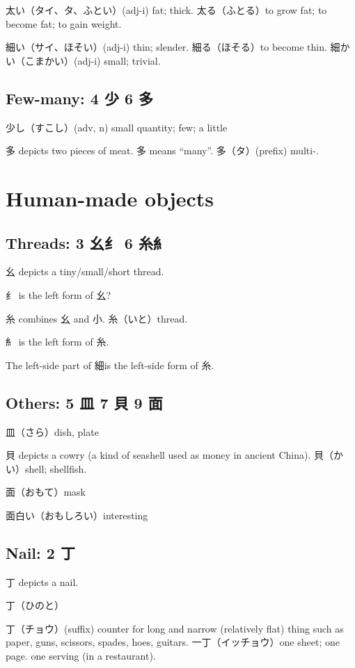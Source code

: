 太い（タイ、タ、ふとい）(adj-i) fat; thick.
太る（ふとる）to grow fat; to become fat; to gain weight.

細い（サイ、ほそい）(adj-i) thin; slender.
細る（ほそる）to become thin.
細かい（こまかい）(adj-i) small; trivial.

\subsection{Few-many: 4 少 6 多}

少し（すこし）(adv, n) small quantity; few; a little

多 depicts two pieces of meat.
多 means ``many''.
多（タ）(prefix) multi-.

\section{Human-made objects}

\subsection{Threads: 3 幺纟 6 糸糹}

幺 depicts a tiny/small/short thread.

纟 is the left form of 幺?

糸 combines 幺 and 小.
糸（いと）thread.

糹 is the left form of 糸.

The left-side part of 細is the left-side form of 糸.

\subsection{Others: 5 皿 7 貝 9 面}

皿（さら）dish, plate

貝 depicts a cowry (a kind of seashell used as money in ancient China).
貝（かい）shell; shellfish.

面（おもて）mask

面白い（おもしろい）interesting

\subsection{Nail: 2 丁}

丁 depicts a nail.

丁（ひのと）

丁（チョウ）(suffix)
counter for long and narrow (relatively flat) thing
such as paper, guns, scissors, spades, hoes, guitars.
一丁（イッチョウ）one sheet; one page.
one serving (in a restaurant).

